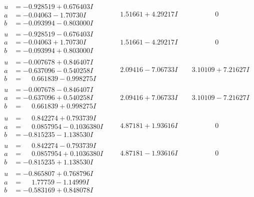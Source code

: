 \documentclass[1p]{elsarticle_modified}
\theoremstyle{definition}
\begin{document}
$$\begin{array}{c|c|c}
\begin{aligned}
u &= -0.928519 + 0.676403 I \\
a &= -0.04063 - 1.70730 I \\
b &= -0.093994 - 0.803000 I\end{aligned}
 & \phantom{-}1.51661 + 4.29217 I & \phantom{-0.000000 } 0 \\ \hline\begin{aligned}
u &= -0.928519 - 0.676403 I \\
a &= -0.04063 + 1.70730 I \\
b &= -0.093994 + 0.803000 I\end{aligned}
 & \phantom{-}1.51661 - 4.29217 I & \phantom{-0.000000 } 0 \\ \hline\begin{aligned}
u &= -0.007678 + 0.846407 I \\
a &= -0.637096 - 0.540258 I \\
b &= \phantom{-}0.661839 - 0.998275 I\end{aligned}
 & \phantom{-}2.09416 - 7.06733 I & \phantom{-}3.10109 + 7.21627 I \\ \hline\begin{aligned}
u &= -0.007678 - 0.846407 I \\
a &= -0.637096 + 0.540258 I \\
b &= \phantom{-}0.661839 + 0.998275 I\end{aligned}
 & \phantom{-}2.09416 + 7.06733 I & \phantom{-}3.10109 - 7.21627 I \\ \hline\begin{aligned}
u &= \phantom{-}0.842274 + 0.793739 I \\
a &= \phantom{-}0.0857954 - 0.1036380 I \\
b &= -0.815235 - 1.138530 I\end{aligned}
 & \phantom{-}4.87181 + 1.93616 I & \phantom{-0.000000 } 0 \\ \hline\begin{aligned}
u &= \phantom{-}0.842274 - 0.793739 I \\
a &= \phantom{-}0.0857954 + 0.1036380 I \\
b &= -0.815235 + 1.138530 I\end{aligned}
 & \phantom{-}4.87181 - 1.93616 I & \phantom{-0.000000 } 0 \\ \hline\begin{aligned}
u &= -0.865807 + 0.768796 I \\
a &= \phantom{-}1.77759 - 1.14999 I \\
b &= -0.583169 + 0.848078 I\end{aligned}

\end{array}$$
\end{document}
